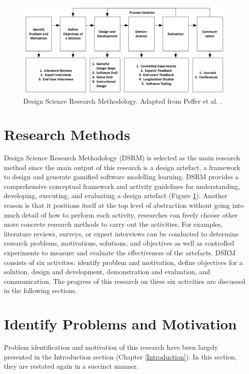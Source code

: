 \documentclass[12pt, a4paper]{report} \usepackage[titletoc]{appendix}
\begin{document}
\begin{figure}[ht] \centering \includegraphics[width=\textwidth]{dsrm}
\caption{Design Science Research Methodology. Adapted from Peffer et al. \cite{peffers2007design}.}
\label{dsrm}
\end{figure}

\section{Research Methods}
\label{Research Methods}
Design Science Research Methodology (DSRM) is selected as the main research method since the main output of this research is a design artefact, a framework to design and generate gamified software modelling learning. DSRM provides a comprehensive conceptual framework and activity guidelines for understanding, developing, executing, and evaluating a design artefact (Figure \ref{dsrm}). Another reason is that it positions itself at the top level of abstraction without going into much detail of how to perform each activity, researches can freely choose other more concrete research methods to carry out the activities. For examples, literature reviews, surveys, or expert interviews can be conducted to determine research problems, motivations, solutions, and objectives as well as controlled experiments to measure and evaluate the effectiveness of the artefacts. DSRM consists of six activities: identify problem and motivation, define objectives for a solution, design and development, demonstration and evaluation, and communication. The progress of this research on these six activities are discussed in the following sections.

\section{Identify Problems and Motivation}
Problem identification and motivation of this research have been largely presented in the Introduction section (Chapter \ref{Introduction}). In this section, they are restated again in a succinct manner. 
\end{document}
